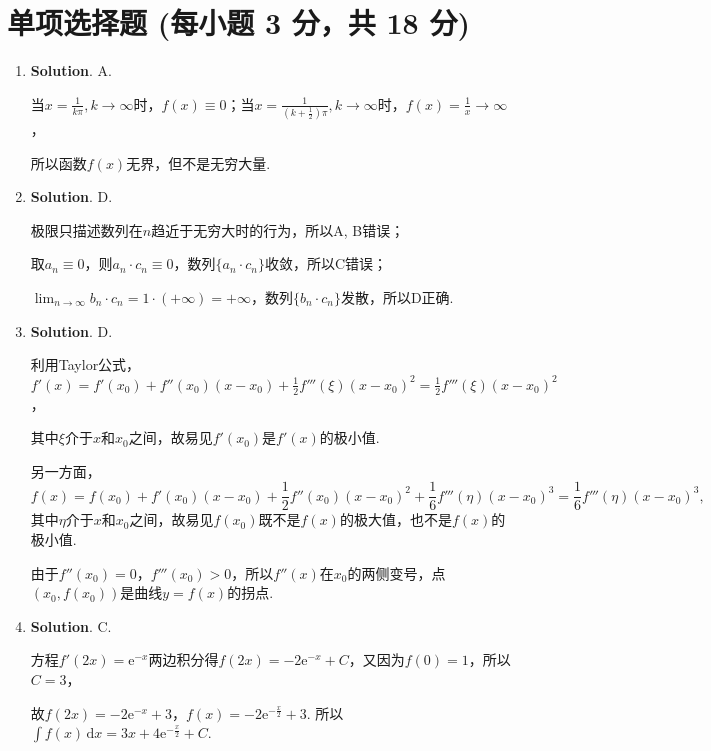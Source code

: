 \documentclass[../main.tex]{subfiles}
\begin{document}
\section{单项选择题 (每小题 3 分，共 18 分)}
\begin{enumerate}
    \item \textbf{Solution}. A.

          当$x=\frac{1}{k\pi},k\to\infty$时，$f(x)\equiv0$；当$x=\frac{1}{(k+\frac{1}{2})\pi}
              ,k\to\infty$时，$f(x)=\frac{1}{x}\to\infty$，

          所以函数$f(x)$无界，但不是无穷大量.

    \item \textbf{Solution}. D.

          极限只描述数列在$n$趋近于无穷大时的行为，所以A, B错误；

          取$a_{n}\equiv0$，则$a_{n}\cdot c_{n}\equiv0$，数列$\{a_{n}\cdot c_{n}\}$收敛，所以C错误；

          $\lim_{n\to\infty}b_{n}\cdot c_{n}=1\cdot(+\infty)=+\infty$，数列$\{b_{n}\cdot
              c_{n}\}$发散，所以D正确.

    \item \textbf{Solution}. D.

          利用Taylor公式，$f'(x)=f'(x_{0})+f''(x_{0})(x-x_{0})+\frac{1}{2}f'''(\xi)(x
              -x_{0})^{2}=\frac{1}{2}f'''(\xi)(x-x_{0})^{2}$，

          其中$\xi$介于$x$和$x_{0}$之间，故易见$f'(x_{0})$是$f'(x)$的极小值.

          另一方面，
          \[
              f(x)=f(x_{0})+f'(x_{0})(x-x_{0})+\frac{1}{2}f''(x_{0})(x-x_{0})^{2}
              +\frac{1}{6}f'''(\eta)(x-x_{0})^{3}=\frac{1}{6}f'''(\eta)(x-x_{0})^{3},
          \]
          其中$\eta$介于$x$和$x_{0}$之间，故易见$f(x_{0})$既不是$f(x)$的极大值，也不是$f
              (x)$的极小值.

          由于$f''(x_{0})=0$，$f'''(x_{0})>0$，所以$f''(x)$在$x_{0}$的两侧变号，点$(x
                  _{0},f(x_{0}))$是曲线$y=f(x)$的拐点.

    \item \textbf{Solution}. C.

          方程$f'(2x)=\mathrm{e}^{-x}$两边积分得$f(2x)=-2\mathrm{e}^{-x}+C$，又因为$f
              (0)=1$，所以$C=3$，

          故$f(2x)=-2\mathrm{e}^{-x}+3$，$f(x)=-2\mathrm{e}^{-\frac{x}{2}}+3$. 所以$\int
              f(x)\,\mathrm{d}x=3x+4\mathrm{e}^{-\frac{x}{2}}+C$.


\end{enumerate}
\end{document}
